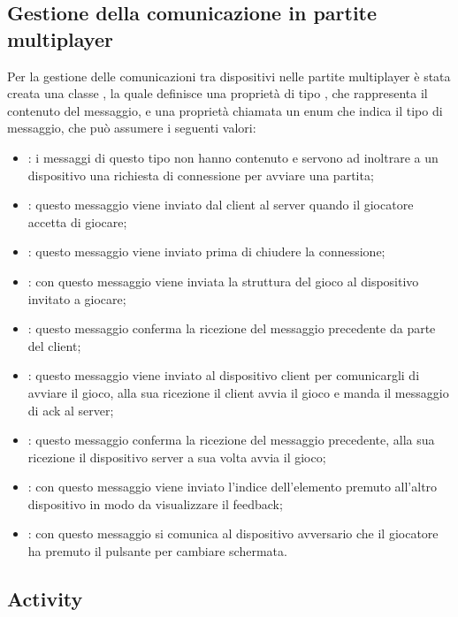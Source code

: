 \subsection{Gestione della comunicazione in partite multiplayer}
\noindent Per la gestione delle comunicazioni tra dispositivi nelle partite multiplayer \`{e} stata creata una classe , la quale definisce una propriet\`{a} di tipo , che rappresenta il contenuto del messaggio, e una propriet\`{a} chiamata  un enum che indica il tipo di messaggio, che pu\`{o} assumere i seguenti valori:
\begin{itemize}
\item {}: i messaggi di questo tipo non hanno contenuto e servono ad inoltrare a un dispositivo una richiesta di connessione per avviare una partita;
\item {}: questo messaggio viene inviato dal client al server quando il giocatore accetta di giocare;
\item {}: questo messaggio viene inviato prima di chiudere la connessione;
\item {}: con questo messaggio viene inviata la struttura del gioco al dispositivo invitato a giocare;
\item {}: questo messaggio conferma la ricezione del messaggio precedente da parte del client;
\item {}: questo messaggio viene inviato al dispositivo client per comunicargli di avviare il gioco, alla sua ricezione il client avvia il gioco e manda il messaggio di ack al server;
\item {}: questo messaggio conferma la ricezione del messaggio precedente, alla sua ricezione il dispositivo server a sua volta avvia il gioco;
\item {}: con questo messaggio viene inviato l'indice dell'elemento premuto all'altro dispositivo in modo da visualizzare il feedback;
\item {}: con questo messaggio si comunica al dispositivo avversario che il giocatore ha premuto il pulsante per cambiare schermata.
\end{itemize}

\subsection{Activity}

